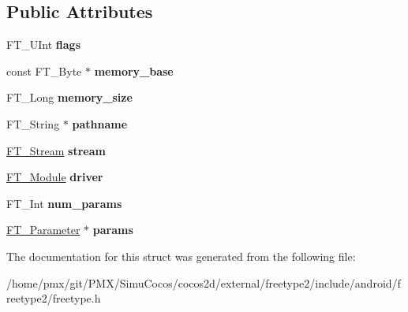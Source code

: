 \subsection*{Public Attributes}
\begin{DoxyCompactItemize}
\item 
\mbox{\label{structFT__Open__Args___a2e3e6b9284fe8b4d9833e247a19181fa}} 
F\+T\+\_\+\+U\+Int {\bfseries flags}
\item 
\mbox{\label{structFT__Open__Args___a910cc07f1540e13231bf72116a9191d3}} 
const F\+T\+\_\+\+Byte $\ast$ {\bfseries memory\+\_\+base}
\item 
\mbox{\label{structFT__Open__Args___a87f0bb2f257abe94c93a79e0de3525da}} 
F\+T\+\_\+\+Long {\bfseries memory\+\_\+size}
\item 
\mbox{\label{structFT__Open__Args___a377dea270ffeecc5dbfab69f57b6d376}} 
F\+T\+\_\+\+String $\ast$ {\bfseries pathname}
\item 
\mbox{\label{structFT__Open__Args___ae1e6444bf0c21b323ce6cbe8bc475b2b}} 
\hyperlink{structFT__StreamRec__}{F\+T\+\_\+\+Stream} {\bfseries stream}
\item 
\mbox{\label{structFT__Open__Args___a7c01bd7e34a440c3e89141ee521e2646}} 
\hyperlink{structFT__ModuleRec__}{F\+T\+\_\+\+Module} {\bfseries driver}
\item 
\mbox{\label{structFT__Open__Args___afaf47d9e1631f2147b696fd7f5a6f4eb}} 
F\+T\+\_\+\+Int {\bfseries num\+\_\+params}
\item 
\mbox{\label{structFT__Open__Args___a59a3957c1b546b73cd56d68ae6893f7b}} 
\hyperlink{structFT__Parameter__}{F\+T\+\_\+\+Parameter} $\ast$ {\bfseries params}
\end{DoxyCompactItemize}


The documentation for this struct was generated from the following file\+:\begin{DoxyCompactItemize}
\item 
/home/pmx/git/\+P\+M\+X/\+Simu\+Cocos/cocos2d/external/freetype2/include/android/freetype2/freetype.\+h\end{DoxyCompactItemize}
